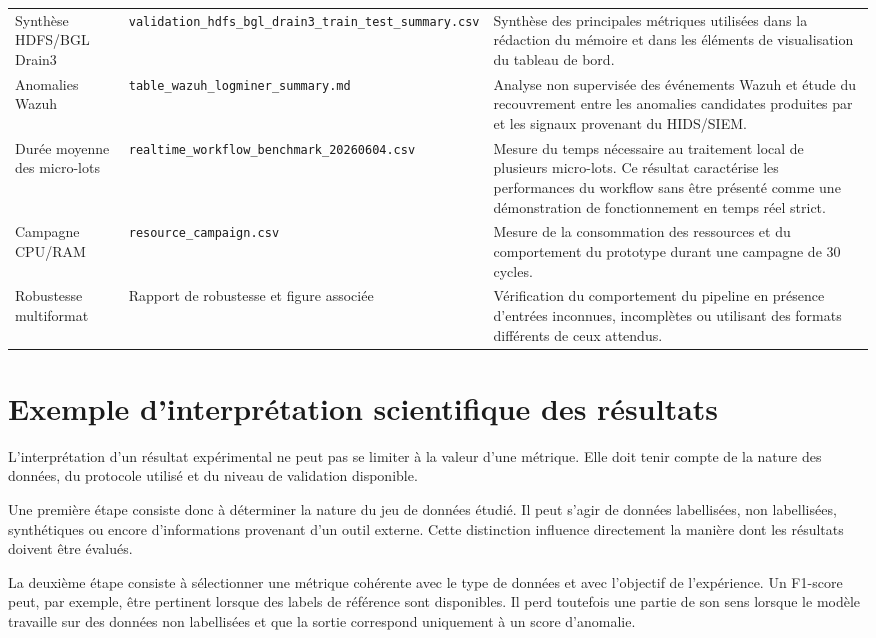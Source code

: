 \begin{longtable}{p{3.2cm}p{4.2cm}p{5.5cm}}
Synthèse HDFS/BGL Drain3 &
\texttt{validation\_hdfs\_bgl\_drain3\_train\_test\_summary.csv} &
Synthèse des principales métriques utilisées dans la rédaction du mémoire et dans les éléments de visualisation du tableau de bord. \\

Anomalies Wazuh &
\texttt{table\_wazuh\_logminer\_summary.md} &
Analyse non supervisée des événements Wazuh et étude du recouvrement entre les anomalies candidates produites par \logminer{} et les signaux provenant du HIDS/SIEM. \\

Durée moyenne des micro-lots &
\texttt{realtime\_workflow\_benchmark\_20260604.csv} &
Mesure du temps nécessaire au traitement local de plusieurs micro-lots. Ce résultat caractérise les performances du workflow sans être présenté comme une démonstration de fonctionnement en temps réel strict. \\

Campagne CPU/RAM &
\texttt{resource\_campaign.csv} &
Mesure de la consommation des ressources et du comportement du prototype durant une campagne de 30 cycles. \\

Robustesse multiformat &
Rapport de robustesse et figure associée &
Vérification du comportement du pipeline en présence d'entrées inconnues, incomplètes ou utilisant des formats différents de ceux attendus. \\

\bottomrule

\end{longtable}


\section{Exemple d'interprétation scientifique des résultats}

L'interprétation d'un résultat expérimental ne peut pas se limiter à la valeur d'une métrique. Elle doit tenir compte de la nature des données, du protocole utilisé et du niveau de validation disponible.

Une première étape consiste donc à déterminer la nature du jeu de données étudié. Il peut s'agir de données labellisées, non labellisées, synthétiques ou encore d'informations provenant d'un outil externe. Cette distinction influence directement la manière dont les résultats doivent être évalués.

La deuxième étape consiste à sélectionner une métrique cohérente avec le type de données et avec l'objectif de l'expérience. Un F1-score peut, par exemple, être pertinent lorsque des labels de référence sont disponibles. Il perd toutefois une partie de son sens lorsque le modèle travaille sur des données non labellisées et que la sortie correspond uniquement à un score d'anomalie.

